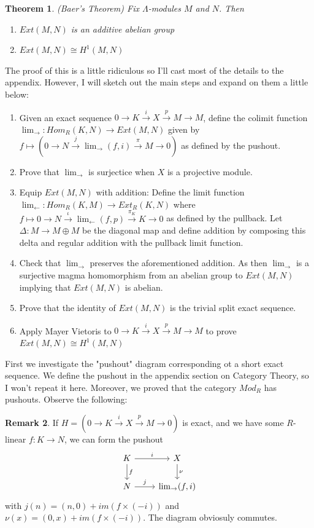 \documentclass[12pt]{book}
\newtheorem{theorem}{Theorem}[chapter]
\theoremstyle{definition}
\newtheorem{remark}[theorem]{Remark}
\begin{document}
\begin{theorem}(Baer's Theorem)
    Fix $\Lambda$-modules $M$ and $N$. Then
    \begin{enumerate}
        \item $Ext(M,N)$ is an additive abelian group 
        \item $Ext(M,N) \cong H^1(M,N)$
    \end{enumerate}
\end{theorem}
The proof of this is a little ridiculous so I'll cast most of the details to the appendix. However, I will sketch out the main steps and expand on them a little below:
\begin{enumerate}
    \item Given an exact sequence $0 \rightarrow K \xrightarrow{i} X \xrightarrow{p} M \rightarrow M$, define the colimit function $\lim_{\rightarrow} : Hom_R(K,N) \to Ext(M,N)$ given by $f \mapsto (0 \rightarrow N \xrightarrow{j} \lim_{\rightarrow}(f,i) \xrightarrow{\pi} M \rightarrow 0)$ as defined by the pushout.
    \item Prove that $\lim_{\rightarrow}$ is surjectice when $X$ is a projective module. 
    \item Equip $Ext(M,N)$ with addition: Define the limit function $\lim_{\leftarrow}: Hom_R(K,M) \to Ext_R(K,N)$ where $f \mapsto 0 \rightarrow N \xrightarrow{\iota} \lim_{\leftarrow}(f,p) \xrightarrow{\pi_K} K \rightarrow 0$ as defined by the pullback. Let $\Delta: M \to M \oplus M$ be the diagonal map and define addition by composing this delta and regular addition with the pullback limit function. 
    \item Check that $\lim_{\rightarrow}$ preserves the aforementioned addition. As then $\lim_{\rightarrow}$ is a surjective magma homomorphism from an abelian group to $Ext(M,N)$ implying that $Ext(M,N)$ is abelian. 
    \item Prove that the identity of $Ext(M,N)$ is the trivial split exact sequence. 
    \item Apply Mayer Vietoris to $0 \rightarrow K \xrightarrow{i} X \xrightarrow{p} M \rightarrow M$ to prove $Ext(M,N) \cong H^1(M,N)$
\end{enumerate}
First we investigate the "pushout" diagram corresponding ot a short exact sequence. We define the pushout in the appendix section on Category Theory, so I won't repeat it here. Moreover, we proved that the category $Mod_R$ has pushouts. Observe the following: 
\begin{remark}
    If $H = (0 \rightarrow K \xrightarrow{i} X \xrightarrow{p} M \rightarrow 0)$ is exact, and we have some $R$-linear $f: K \to N$, we can form the pushout 
    \[
    \begin{tikzcd}
        K \arrow[r, "i"] \arrow[d, "f"] & X \arrow[d, "\nu"]\\
        N \arrow[r, "j"] & \lim_{\rightarrow}(f,i) 
    \end{tikzcd}
    \]
    with $j(n) = (n,0) + im(f \times (-i))$ and $\nu(x) = (0,x) + im(f \times (-i))$. The diagram obviosuly commutes. 
\end{remark}
\end{document}
